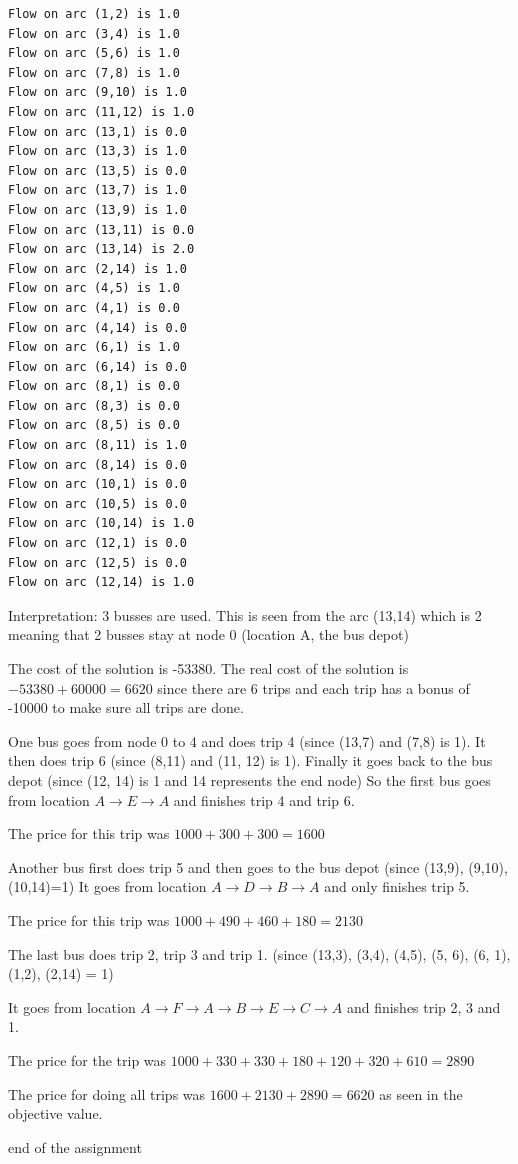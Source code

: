 \documentclass{article}
\begin{document}
\begin{commandline}
	\begin{verbatim}
Flow on arc (1,2) is 1.0
Flow on arc (3,4) is 1.0
Flow on arc (5,6) is 1.0
Flow on arc (7,8) is 1.0
Flow on arc (9,10) is 1.0
Flow on arc (11,12) is 1.0
Flow on arc (13,1) is 0.0
Flow on arc (13,3) is 1.0
Flow on arc (13,5) is 0.0
Flow on arc (13,7) is 1.0
Flow on arc (13,9) is 1.0
Flow on arc (13,11) is 0.0
Flow on arc (13,14) is 2.0
Flow on arc (2,14) is 1.0
Flow on arc (4,5) is 1.0
Flow on arc (4,1) is 0.0
Flow on arc (4,14) is 0.0
Flow on arc (6,1) is 1.0
Flow on arc (6,14) is 0.0
Flow on arc (8,1) is 0.0
Flow on arc (8,3) is 0.0
Flow on arc (8,5) is 0.0
Flow on arc (8,11) is 1.0
Flow on arc (8,14) is 0.0
Flow on arc (10,1) is 0.0
Flow on arc (10,5) is 0.0
Flow on arc (10,14) is 1.0
Flow on arc (12,1) is 0.0
Flow on arc (12,5) is 0.0
Flow on arc (12,14) is 1.0
	\end{verbatim}
\end{commandline}

Interpretation:
3 busses are used. This is seen from the arc (13,14) which is 2 meaning that 2 busses stay at node 0 (location A, the bus depot)

The cost of the solution is -53380. The real cost of the solution is $-53380+60000=6620$ since there are 6 trips and each trip has a bonus of -10000 to make sure all trips are done.

\vspace{5mm}
One bus goes from node 0 to 4 and does trip 4 (since (13,7) and (7,8) is 1). 
It then does trip 6 (since (8,11) and (11, 12) is 1). 
Finally it goes back to the bus depot (since (12, 14) is 1 and 14 represents the end node)
So the first bus goes from location $A\rightarrow E\rightarrow A$ and finishes trip 4 and trip 6.

The price for this trip was $1000+300+300=1600$


\vspace{5mm}
Another bus first does trip 5 and then goes to the bus depot (since (13,9), (9,10), (10,14)=1)
It goes from location $A\rightarrow D\rightarrow B\rightarrow A$ and only finishes trip 5.

The price for this trip was $1000+490+460+180=2130$

\vspace{5mm}
The last bus does trip 2, trip 3 and trip 1. (since (13,3), (3,4), (4,5), (5, 6), (6, 1), (1,2), (2,14) = 1)

It goes from location $A\rightarrow F\rightarrow A\rightarrow B\rightarrow E\rightarrow C\rightarrow A$ and finishes trip 2, 3 and 1.

The price for the trip was $1000+330+330+180+120+320+610=2890$

The price for doing all trips was $1600+2130+2890=6620$ as seen in the objective value.


\vspace{5mm}
\hrulefill 
end of the assignment
\end{document}
